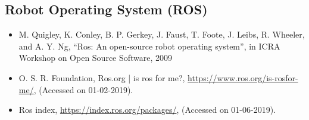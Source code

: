 \subsection{Robot Operating System (ROS)}
\begin{itemize}
    \item M. Quigley, K. Conley, B. P. Gerkey, J. Faust, T. Foote, J. Leibs, R. Wheeler, and
A. Y. Ng, “Ros: An open-source robot operating system”, in ICRA Workshop on Open
Source Software, 2009
    \item O. S. R. Foundation, Ros.org | is ros for me?, \url{https://www.ros.org/is-rosfor-me/}, (Accessed on 01-02-2019).
    \item Ros index, \url{https://index.ros.org/packages/}, (Accessed on 01-06-2019).
\end{itemize}




